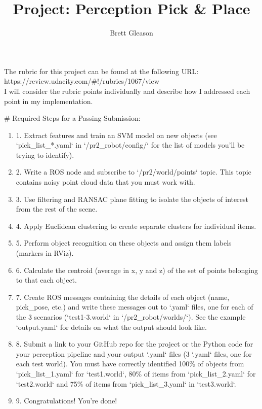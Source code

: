 \documentclass{article}
\begin{document}
\title{Project: Perception Pick \& Place}
\author{Brett Gleason}

\maketitle

The rubric for this project can be found at the following URL: \\
https://review.udacity.com/#!/rubrics/1067/view \\
I will consider the rubric points individually and describe how I addressed each point in my implementation.

# Required Steps for a Passing Submission:

\begin{enumerate}
    \item 1. Extract features and train an SVM model on new objects (see `pick\_list\_*.yaml` in `/pr2\_robot/config/` for the list of models you'll be trying to identify). 
    \item 2. Write a ROS node and subscribe to `/pr2/world/points` topic. This topic contains noisy point cloud data that you must work with.
    \item 3. Use filtering and RANSAC plane fitting to isolate the objects of interest from the rest of the scene.
    \item 4. Apply Euclidean clustering to create separate clusters for individual items.
    \item 5. Perform object recognition on these objects and assign them labels (markers in RViz).
    \item 6. Calculate the centroid (average in x, y and z) of the set of points belonging to that each object.
    \item 7. Create ROS messages containing the details of each object (name, pick\_pose, etc.) and write these messages out to `.yaml` files, one for each of the 3 scenarios (`test1-3.world` in `/pr2\_robot/worlds/`).  See the example `output.yaml` for details on what the output should look like.  
    \item 8. Submit a link to your GitHub repo for the project or the Python code for your perception pipeline and your output `.yaml` files (3 `.yaml` files, one for each test world).  You must have correctly identified 100\% of objects from `pick\_list\_1.yaml` for `test1.world`, 80\% of items from `pick\_list\_2.yaml` for `test2.world` and 75\% of items from `pick\_list\_3.yaml` in `test3.world`.
    \item 9. Congratulations!  You're done!
\end{enumerate}
\end{document}
